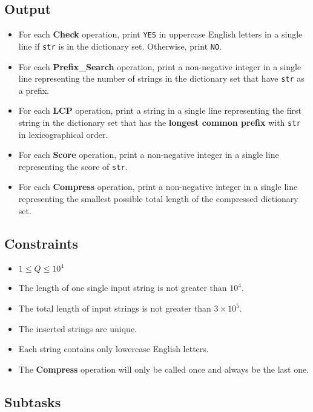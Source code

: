 \subsection{Output}\label{output}

\begin{itemize}
    \item For each \textbf{Check} operation, print \texttt{YES} in uppercase English letters in a single line if \texttt{str} is in the dictionary set. Otherwise, print \texttt{NO}.
    \item For each \textbf{Prefix\_Search} operation, print a non-negative integer in a single line representing the number of strings in the dictionary set that have \texttt{str} as a prefix.
    \item For each \textbf{LCP} operation, print a string in a single line representing the first string in the dictionary set that has the \textbf{longest common prefix} with \texttt{str} in lexicographical order.
    \item For each \textbf{Score} operation, print a non-negative integer in a single line representing the score of \texttt{str}.
    \item For each \textbf{Compress} operation, print a non-negative integer in a single line representing the smallest possible total length of the compressed dictionary set.
\end{itemize}

\subsection{Constraints}

\begin{itemize}
    \item $1 \leq Q \leq 10^4$
    \item The length of one single input string is not greater than $10^4$.
    \item The total length of input strings is not greater than $3 \times 10^5$.
    \item The inserted strings are unique.
    \item Each string contains only lowercase English letters.
    \item The \textbf{Compress} operation will only be called once and always be the last one.
\end{itemize}

\subsection{Subtasks}

